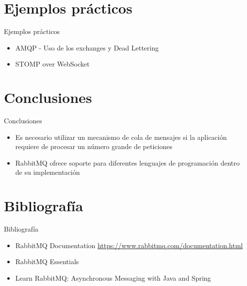 \documentclass{beamer}
\begin{document}
  \section{Ejemplos prácticos}
  \begin{frame}{Ejemplos prácticos}
    \begin{itemize}
      \item AMQP - Uso de los exchanges y Dead Lettering
      \item STOMP over WebSocket
    \end{itemize}
  \end{frame}

  \section{Conclusiones}
  \begin{frame}{Conclusiones}
    \begin{itemize}
      \item Es necesario utilizar un mecanismo de cola de mensajes si
      la aplicación requiere de procesar un número grande de peticiones
      \item RabbitMQ ofrece soporte para diferentes lenguajes de programación
      dentro de su implementación
    \end{itemize}
  \end{frame}

  \section{Bibliografía}
  \begin{frame}{Bibliografía}
    \begin{itemize}
      \item RabbitMQ Documentation \url{https://www.rabbitmq.com/documentation.html}
      \item RabbitMQ Essentials
      \item Learn RabbitMQ: Asynchronous Messaging with Java and Spring
    \end{itemize}
  \end{frame}
\end{document}
